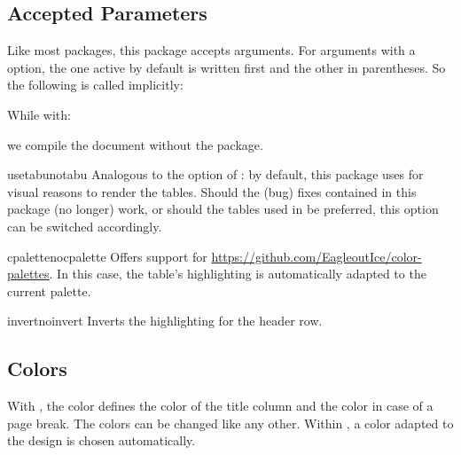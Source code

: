 \documentclass{sopra-base}
\begin{document}
\subsection{Accepted Parameters}
    Like most packages, this package accepts arguments.
    For arguments with a  option, the one active by default is written first and the other in parentheses.
    So the following is called implicitly:
\begin{plainlatex}
    \usepackage[usetabu]{sopra-tables}
\end{plainlatex}
    While with:
\begin{plainlatex}
    \usepackage[notabu]{sopra-tables}
\end{plainlatex}
    we compile the document without the  package.

    \begin{argument}{usetabu}{notabu}
        Analogous to the  option of : by default, this package uses  for visual reasons to render the tables. Should the (bug) fixes contained in this package (no longer) work, or should the  tables used in  be preferred, this option can be switched accordingly.  
    \end{argument}

    \begin{argument}{cpalette}{nocpalette}
        Offers support for \href{color-palettes}{https://github.com/EagleoutIce/color-palettes}. In this case, the table's highlighting is automatically adapted to the current palette.
    \end{argument}

    \begin{argument}{invert}{noinvert}
        Inverts the highlighting for the header row.
    \end{argument}

    \subsection{Colors}

    With , the color  defines the color of the title column and  the color in case of a page break. The colors can be changed like any other. Within , a color adapted to the design is chosen automatically.
\end{document}

